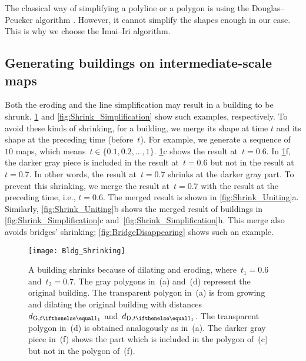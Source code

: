 The classical way of simplifying
a polyline or a polygon is using 
the Douglas--Peucker algorithm \citep{Douglas1973}. 
However, it cannot simplify the shapes enough in our case.
This is why we choose the Imai--Iri algorithm.


%
%
%
%


\subsection{Generating buildings on intermediate-scale maps}
\label{sec:Unite}

Both the eroding and the line simplification 
may result in a building to be shrunk.
\fig\ref{fig:Shrink_Erosion} and 
\fig\ref{fig:Shrink_Simplification} show such 
examples, respectively.
To avoid these kinds of shrinking,
for a building, we merge its shape at time $t$ 
and its shape at the preceding time (before~$t$). 
For example, we generate a sequence of~$10$ maps,
which means~$t \in \{0.1, 0.2, \dots, 1\}$.
\fig\ref{fig:Shrink_Erosion}c shows the result at~$t=0.6$.
In \fig\ref{fig:Shrink_Erosion}f, 
the darker gray piece is included in the result at~$t=0.6$
but not in the result at~$t=0.7$.
In other words, the result at~$t=0.7$ 
shrinks at the darker gray part.
To prevent this shrinking, 
we merge the result at~$t=0.7$ with 
the result at the preceding time, i.e., $t=0.6$.
The merged result is shown in \fig\ref{fig:Shrink_Uniting}a.
Similarly, \fig\ref{fig:Shrink_Uniting}b shows the merged 
result of buildings 
in \fig\ref{fig:Shrink_Simplification}c 
and~\fig\ref{fig:Shrink_Simplification}h.
This merge also avoids bridges' shrinking;
\fig\ref{fig:BridgeDisappearing} shows such an example.

\begin{figure}[tb]
	\centering
	\texttt{[image: Bldg\_Shrinking]}
	\caption{A building shrinks because of dilating and eroding, 
		where~$t_1=0.6$ and~$t_2=0.7$.
		The gray polygons in~(a) and~(d) 
		represent the original building.
		The transparent polygon in~(a) is from 
		growing and dilating the original building with 
		distances~$\dtrm[1]{G}$ and~$\dtrm[1]{D}$.
		The transparent polygon in~(d) is obtained analogously
		as in~(a).
		The darker gray piece in~(f) shows 
		the part which is included in the polygon of~(c) 
		but not in the polygon of~(f).
	}
	\label{fig:Shrink_Erosion}
\end{figure}


